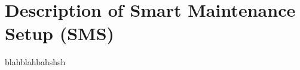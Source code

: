 \chapter{Description of Smart Maintenance Setup (SMS)}\label{ch:myappendix2}

blahblahbahshsh

\instructionsappendices


\cleardoublepage

